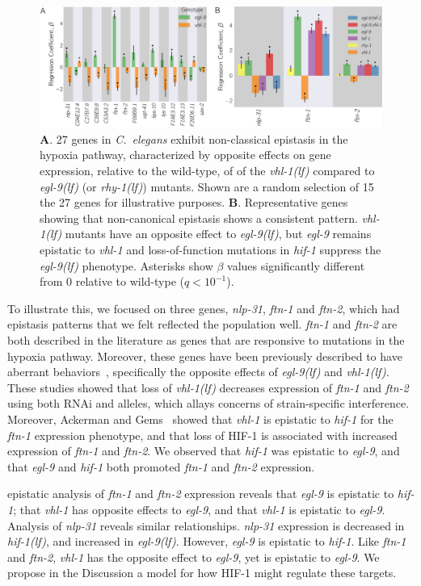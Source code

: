 \documentclass[10pt, onecolumn]{article}
\newcommand{\qval}[1]{$q<10^{-#1}$}
\newcommand{\cel}{\emph{C.~elegans}}
\newcommand{\gene}[1]{\emph{#1}}
\newcommand{\nlp}{\emph{\mbox{nlp-31}}}
\newcommand{\ftna}{\emph{\mbox{ftn-1}}}
\newcommand{\ftnb}{\emph{\mbox{ftn-2}}}
\newcommand{\egl}{\emph{\mbox{egl-9}(lf)}}
\newcommand{\rhy}{\emph{\mbox{rhy-1}(lf)}}
\newcommand{\vhl}{\emph{\mbox{vhl-1}(lf)}}
\newcommand{\hif}{\emph{\mbox{hif-1(lf)}}}
\newcommand{\hifp}{HIF-1}
\begin{document}
\begin{figure}[tbhp]
\centering
\includegraphics[width=.9\linewidth]{../figs/hif1oh-epistasis-horizontal.pdf}
\caption{
\textbf{A}. 27 genes in \cel{} exhibit non-classical epistasis in the hypoxia
pathway, characterized by opposite effects on gene expression, relative to the
wild-type, of of the \vhl{} compared to \egl{} (or
\rhy{}) mutants. Shown are a random selection of 15 the 27 genes for illustrative
purposes.
\textbf{B}. Representative genes showing that non-canonical epistasis shows a
consistent pattern. \vhl{} mutants have an opposite effect to \egl{}, but
\gene{egl-9} remains epistatic to \gene{vhl-1} and loss-of-function mutations in
\gene{hif-1} suppress the \egl{} phenotype. Asterisks show $\beta$ values
significantly different from 0 relative to wild-type (\qval{1}).
}
\label{fig:hif1oh}
\end{figure}

To illustrate this, we focused on three genes, \nlp{}, \ftna{} and \ftnb{}, which
had epistasis patterns that we felt reflected the population well. \ftna{} and
\ftnb{} are both described in the literature as genes that are responsive to
mutations in the hypoxia pathway. Moreover, these genes have been previously
described to have aberrant behaviors~\cite{Ackerman2012,Romney2011}, specifically
the opposite effects of \egl{} and \vhl{}. These studies showed that loss of \vhl{}
decreases expression of \ftna{} and \ftnb{} using both RNAi and alleles, which
allays concerns of strain-specific interference. Moreover, Ackerman and
Gems~\cite{Ackerman2012} showed that \gene{vhl-1} is epistatic to \gene{hif-1}
for the \ftna{} expression phenotype, and that loss of \hifp{} is associated with
increased expression of \ftna{} and \ftnb{}. We observed that \gene{hif-1} was
epistatic to \gene{egl-9}, and that \gene{egl-9} and \gene{hif-1} both promoted
\ftna{} and \ftnb{} expression.

epistatic analysis of \ftna{} and \ftnb{} expression reveals that \gene{egl-9} is
epistatic to \gene{hif-1}; that \gene{vhl-1} has opposite effects to \gene{egl-9},
and that \gene{vhl-1} is epistatic to \gene{egl-9}. Analysis of \nlp{}
reveals similar relationships. \nlp{} expression is decreased in \hif{},
and increased in \egl{}. However, \gene{egl-9} is epistatic to \gene{hif-1}.
Like \ftna{} and \ftnb{}, \gene{vhl-1} has the opposite effect to \gene{egl-9},
yet is epistatic to \gene{egl-9}. We propose in the Discussion a model for how
\hifp{} might regulate these targets.
\end{document}
